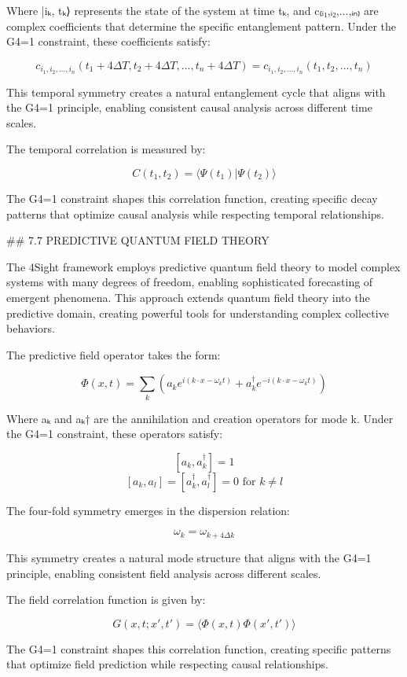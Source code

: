 Where |iₖ, tₖ⟩ represents the state of the system at time tₖ, and c₍ᵢ₁,ᵢ₂,...,ᵢₙ₎ are complex coefficients that determine the specific entanglement pattern. Under the G4=1 constraint, these coefficients satisfy:

$$c_{i_1, i_2, ..., i_n}(t_1+4\Delta T, t_2+4\Delta T, ..., t_n+4\Delta T) = c_{i_1, i_2, ..., i_n}(t_1, t_2, ..., t_n)$$

This temporal symmetry creates a natural entanglement cycle that aligns with the G4=1 principle, enabling consistent causal analysis across different time scales.

The temporal correlation is measured by:

$$C(t_1, t_2) = \langle \Psi(t_1) | \Psi(t_2) \rangle$$

The G4=1 constraint shapes this correlation function, creating specific decay patterns that optimize causal analysis while respecting temporal relationships.

## 7.7 PREDICTIVE QUANTUM FIELD THEORY

The 4Sight framework employs predictive quantum field theory to model complex systems with many degrees of freedom, enabling sophisticated forecasting of emergent phenomena. This approach extends quantum field theory into the predictive domain, creating powerful tools for understanding complex collective behaviors.

The predictive field operator takes the form:

$$\Phi(x, t) = \sum_k \left( a_k e^{i(k \cdot x - \omega_k t)} + a_k^{\dagger} e^{-i(k \cdot x - \omega_k t)} \right)$$

Where aₖ and aₖ† are the annihilation and creation operators for mode k. Under the G4=1 constraint, these operators satisfy:

$$[a_k, a_k^{\dagger}] = 1$$
$$[a_k, a_l] = [a_k^{\dagger}, a_l^{\dagger}] = 0 \text{ for } k \neq l$$

The four-fold symmetry emerges in the dispersion relation:

$$\omega_k = \omega_{k+4\Delta k}$$

This symmetry creates a natural mode structure that aligns with the G4=1 principle, enabling consistent field analysis across different scales.

The field correlation function is given by:

$$G(x, t; x', t') = \langle \Phi(x, t) \Phi(x', t') \rangle$$

The G4=1 constraint shapes this correlation function, creating specific patterns that optimize field prediction while respecting causal relationships.

